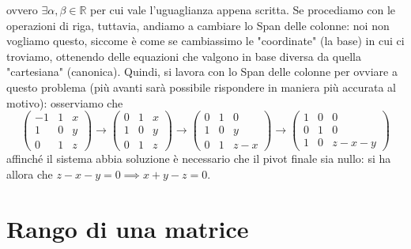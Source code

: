 ovvero $\exists \alpha, \beta \in \mathbb{R}$ per cui vale l'uguaglianza appena scritta. Se procediamo con le operazioni di riga, tuttavia, andiamo a cambiare lo Span delle colonne: noi non vogliamo questo, siccome è come se
cambiassimo le "coordinate" (la base) in cui ci troviamo, ottenendo delle equazioni che valgono in base diversa da quella "cartesiana" (canonica). Quindi, si lavora con lo Span delle colonne per ovviare a questo problema (più avanti sarà possibile rispondere in maniera più accurata al motivo):
osserviamo che
$$
  \begin{pmatrix}
    -1 & 1 & x \\
    1 & 0 & y \\
    0 & 1 & z
  \end{pmatrix} \rightarrow 
  \begin{pmatrix}
    0 & 1 & x \\
    1 & 0 & y \\
    0 & 1 & z
  \end{pmatrix} \rightarrow \begin{pmatrix}
    0 & 1 & 0 \\
    1 & 0 & y \\
    0 & 1 & z-x
  \end{pmatrix} \rightarrow \begin{pmatrix}
    1 & 0 & 0 \\
    0 & 1 & 0 \\
    1 & 0 & z-x-y
  \end{pmatrix}
$$
affinché il sistema abbia soluzione è necessario che il pivot finale sia nullo: si ha allora che $z-x-y = 0 \implies x + y - z = 0$. \\

\section{Rango di una matrice}

